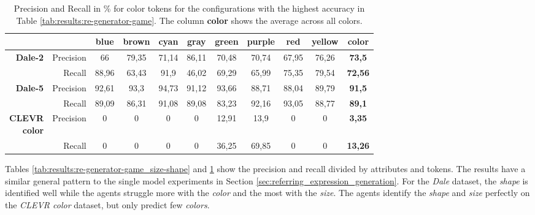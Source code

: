 \begin{table}[ht]
    \centering
    \begin{tabular}{rr|cccccccc|c}
        \toprule
                                         &             & {blue}  & {brown} & {cyan}  & {gray}  & {green} & {purple} & {red}   & {yellow} & \textbf{color}   \\\midrule
        \multirow{2}{*}{\textbf{Dale-2}} & {Precision} & {66}    & {79,35} & {71,14} & {86,11} & {70,48} & {70,74}  & {67,95} & {76,26}  & \textbf{73,5}    \\
                                         & {Recall}    & {88,96} & {63,43} & {91,9}  & {46,02} & {69,29} & {65,99}  & {75,35} & {79,54}  & \textbf{72,56}   \\\midrule
        \multirow{2}{*}{\textbf{Dale-5}} & {Precision} & {92,61} & {93,3}  & {94,73} & {91,12} & {93,66} & {88,71}  & {88,04} & {89,79}  & \textbf{91,5}    \\
                                         & {Recall}    & {89,09} & {86,31} & {91,08} & {89,08} & {83,23} & {92,16}  & {93,05} & {88,77}  & {\textbf{89,1}}  \\\midrule
        \multirowcell{2}[0pt][r]{\textbf{CLEVR}                                                                                                             \\\textbf{color}} & {Precision}           & {0} & {0} & {0} & {0} & {12,91} & {13,9}  & {0} & {0}   & \textbf{3,35} \\
                                         & {Recall}    & {0}     & {0}     & {0}     & {0}     & {36,25} & {69,85}  & {0}     & {0}      & {\textbf{13,26}} \\
        \bottomrule
    \end{tabular}
    \caption{Precision and Recall in \% for color tokens for the configurations with the highest accuracy in Table \ref{tab:results:re-generator-game}. The column \textbf{color} shows the average across all colors.}
    \label{tab:results:re-generator-game_color}
\end{table}

Tables \ref{tab:results:re-generator-game_size-shape} and \ref{tab:results:re-generator-game_color} show the precision and recall divided by attributes and tokens.
The results have a similar general pattern to the single model experiments in Section \ref{sec:referring_expression_generation}.
For the \emph{Dale} dataset, the \emph{shape} is identified well while the agents struggle more with the \emph{color} and the most with the \emph{size}.
The agents identify the \emph{shape} and \emph{size} perfectly on the \emph{CLEVR color} dataset, but only predict few \emph{colors}.

